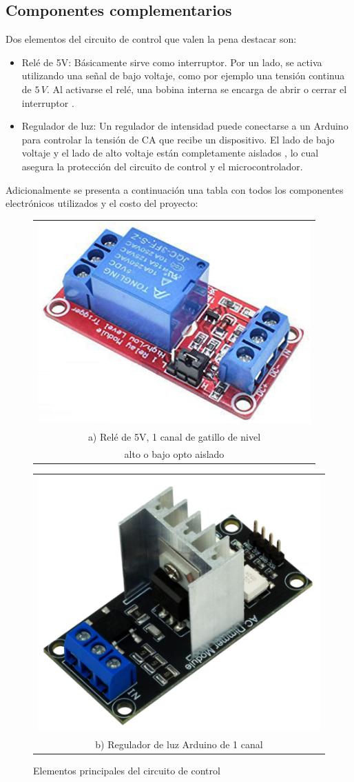 \subsection{Componentes complementarios}

Dos elementos del circuito de control que valen la pena destacar son:

\begin{itemize}
    \item Relé de 5V: Básicamente sirve como interruptor. Por un lado, se activa utilizando una señal de bajo voltaje, como por ejemplo una tensión continua de $5\,V$. Al activarse el relé, una bobina interna se encarga de abrir o cerrar el interruptor \cite{miguel_diaz}.
    
    \item Regulador de luz: Un regulador de intensidad puede conectarse a un Arduino para controlar la tensión de CA que recibe un dispositivo. El lado de bajo voltaje y el lado de alto voltaje están completamente aislados \cite{regulador_amazon}, lo cual asegura la protección del circuito de control y el microcontrolador.
\end{itemize}

Adicionalmente se presenta a continuación una tabla con todos los componentes electrónicos utilizados y el costo del proyecto:
\begin{figure}[h]
  \centering
  \begin{tabular}[b]{c}
    \includegraphics[width=0.35\linewidth]{images/rele.png} \\
    a) Relé de 5V, 1 canal de gatillo de nivel \\ alto o bajo opto aislado \cite{rele_amazon}
  \end{tabular} \qquad
  \begin{tabular}[b]{c}
    \includegraphics[width=0.33\linewidth]{images/regulador.png} \\
    b) Regulador de luz Arduino de 1 canal \cite{regulador_amazon}
  \end{tabular}
  \caption{Elementos principales del circuito de control}
\end{figure}

